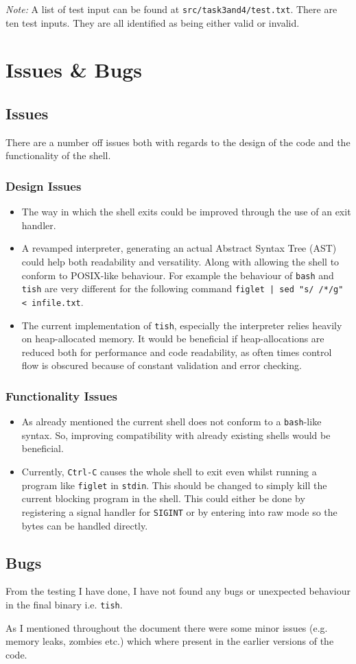 \documentclass[12pt]{article}
\begin{document}
\textit{Note:} A list of test input can be found at
\texttt{src/task3and4/test.txt}. There are ten test inputs. They
are all identified as being either valid or invalid.

\section{Issues \& Bugs}

\subsection{Issues}

There are a number off issues both with regards to the design of
the code and the functionality of the shell.

\subsubsection{Design Issues}

\begin{itemize}
\item
  The way in which the shell exits could be improved through the
  use of an exit handler.
\item
  A revamped interpreter, generating an actual Abstract Syntax
  Tree (AST) could help both readability and versatility. Along
  with allowing the shell to conform to POSIX-like behaviour.
  For example the behaviour of \texttt{bash} and \texttt{tish}
  are very different for the following command \texttt{figlet |
  sed "s/ /*/g" < infile.txt}.
\item
  The current implementation of \texttt{tish}, especially the
  interpreter relies heavily on heap-allocated memory. It would
  be beneficial if heap-allocations are reduced both for
  performance and code readability, as often times
  control flow is obscured because of constant validation and
  error checking.
\end{itemize}

\subsubsection{Functionality Issues}

\begin{itemize}
\item
  As already mentioned the current shell does not conform to a
  \texttt{bash}-like syntax. So, improving compatibility with
  already existing shells would be beneficial.
\item
  Currently, \texttt{Ctrl-C} causes the whole shell to exit even
  whilst running a program like \texttt{figlet} in
  \texttt{stdin}. This should be changed to simply kill the
  current blocking program in the shell. This could either be
  done by registering a signal handler for \texttt{SIGINT} or by
  entering into raw mode so the bytes can be handled directly.
\end{itemize}

\subsection{Bugs}

From the testing I have done, I have not found any bugs or
unexpected behaviour in the final binary i.e. \texttt{tish}.

As I mentioned throughout the document there were some minor
issues (e.g. memory leaks, zombies etc.) which where present in
the earlier versions of the code.
\end{document}
